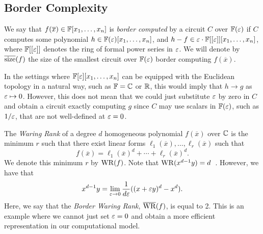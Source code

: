 \documentclass[letterpaper, 11pt]{amsart}
\newif\iffull
\begin{document}
\iffull
\begin{defn}[Iterated Matrix Multiplication]
  Let $n, d \in \Z_{> 0}$ be parameters.
  Let $X_1, X_2, \ldots, X_d$ be $d$ independent matrices of variables.
  Then the \emph{Iterated Matrix Multiplication polynomial}, $\IMM_{n, d}$, is the polynomial in position $(1, 1)$ of the matrix product $X_1 \cdots X_d$.
\end{defn}
\begin{thrm}[\cite{LST25, For24}]
  Let $d = o(\log n)$.
  Then for any $\Delta \geq 1$, computing $\IMM_{n, d}$ with a depth $\Delta$ circuit requires that circuit to have size at least
  \[
    n^{\bigTheta{\frac{1}{F_{\Delta + 2} - 1} / \Delta}}
  \]
  where $F_k$ is the $k$-th Fibonacci number.
\end{thrm}
\fi

\subsection{Border Complexity}

\begin{defn}\label{defn:border_complexity}
  We say that $f(\overline{x}) \in \mathbb{F}[x_1,\dots,x_n]$ is \emph{border computed} by a circuit $C$ over $\mathbb{F}(\varepsilon)$ if $C$ computes some polynomial $h \in \mathbb{F}(\varepsilon)[x_1,\dots,x_n]$, and $h - f \in \varepsilon \cdot \mathbb{F}[[\varepsilon]][x_1,\dots,x_n]$, where $\mathbb{F}[[\varepsilon]]$ denotes the ring of formal power series in $\varepsilon$.
  We will denote by $\overline{\operatorname{size}}(f)$ the size of the smallest circuit over $\mathbb{F}(\varepsilon)$ border computing $f(\overline{x})$.
\end{defn}

In the settings where $\mathbb{F}[\varepsilon][x_1,\dots,x_n]$ can be equipped with the Euclidean topology in a natural way, such as $\mathbb{F} = \mathbb{C}$ or $\mathbb{R}$, this would imply that $h \to g$ as $\varepsilon \mapsto 0$.
However, this does not mean that we could just substitute $\varepsilon$ by zero in $C$ and obtain a circuit exactly computing $g$ since $C$ may use scalars in $\mathbb{F}(\varepsilon)$, such as $1/\varepsilon$, that are not well-defined at $\varepsilon = 0$.

\begin{ex}[{\cite{DL25}}]
  The \emph{Waring Rank} of a degree $d$ homogeneous polynomial $f(\overline{x})$ over $\mathbb{C}$ is the minimum $r$ such that there exist linear forms $\ell_1(\overline{x}), \ldots, \ell_r(\overline{x})$ such that
  \[
    f(\overline{x}) = \ell_1(\overline{x})^d + \cdots + \ell_r(\overline{x})^d.
  \]
  We denote this minimum $r$ by $\operatorname{WR}(f)$.
  Note that $\operatorname{WR}(x^{d - 1} y) = d$~\cite{Old40}.
  However, we have that
  \[
    x^{d - 1}y = \lim_{ \varepsilon \to 0 } \frac{1}{d \varepsilon} ((x + \varepsilon y)^d - x^d).
  \]
  Here, we say that the \emph{Border Waring Rank}, $\overline{\operatorname{WR}}(f)$, is equal to 2.
  This is an example where we cannot just set $\varepsilon = 0$ and obtain a more efficient representation in our computational model.
\end{ex}
\end{document}
